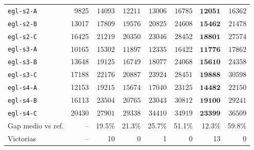 \begin{table}[htbp]
\begin{tabular}{lrrrrrrr}
\texttt{egl-s2-A} & 9825 & $14093$ & $12211$ & $13006$ & $16785$ & $\mathbf{12051}$ & $16362$ \\
\texttt{egl-s2-B} & 13017 & $17809$ & $19576$ & $20825$ & $24608$ & $\mathbf{15462}$ & $21478$ \\
\texttt{egl-s2-C} & 16425 & $21219$ & $20350$ & $23046$ & $28452$ & $\mathbf{18801}$ & $27574$ \\
\texttt{egl-s3-A} & 10165 & $15302$ & $11897$ & $12335$ & $16422$ & $\mathbf{11776}$ & $17862$ \\
\texttt{egl-s3-B} & 13648 & $19125$ & $16749$ & $18077$ & $24068$ & $\mathbf{15610}$ & $24358$ \\
\texttt{egl-s3-C} & 17188 & $22176$ & $20887$ & $23924$ & $28451$ & $\mathbf{19888}$ & $30598$ \\
\texttt{egl-s4-A} & 12153 & $19215$ & $15674$ & $17040$ & $23125$ & $\mathbf{14482}$ & $22150$ \\
\texttt{egl-s4-B} & 16113 & $23504$ & $20765$ & $23043$ & $30812$ & $\mathbf{19100}$ & $29241$ \\
\texttt{egl-s4-C} & 20430 & $27901$ & $29338$ & $34410$ & $34919$ & $\mathbf{23399}$ & $36509$ \\
\midrule
Gap medio vs ref. & -- & 19.5\% & 21.3\% & 25.7\% & 51.1\% & 12.3\% & 59.8\% \\
Victorias & -- & 10 & 0 & 1 & 0 & 13 & 0 \\
\bottomrule
\end{tabular}
\end{table}